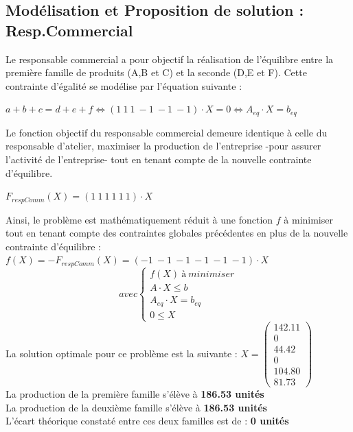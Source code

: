 \documentclass[a4paper, 11pt]{article}
\begin{document}
\subsection{Modélisation et Proposition de solution : Resp.Commercial}
Le responsable commercial a pour objectif la réalisation de l'équilibre entre la première famille de produits (A,B et C) et la seconde (D,E et F). Cette contrainte d'égalité se modélise par l'équation suivante :
\begin{center}
$ a+ b+ c = d+ e+ f\Leftrightarrow(1~1~1~-1~-1~-1)\cdot X = 0 \Leftrightarrow A_{eq}\cdot X = b_{eq} $
\end{center}
Le fonction objectif du responsable commercial demeure identique à celle du responsable d'atelier, maximiser la production de l'entreprise -pour assurer l'activité de l'entreprise- tout en tenant compte de la nouvelle contrainte d'équilibre.
\begin{center}
$F_{respComm} (X) =(1~1~1~1~1~1)\cdot X$ \\
\end{center}
Ainsi, le problème est mathématiquement réduit à une fonction $f$ à minimiser tout en tenant compte des contraintes globales précédentes en plus de la nouvelle contrainte d'équilibre :
$f(X) = -F_{respComm} (X) =(-1~-1~-1~-1~-1~-1)\cdot X$ \\
$$
avec \left\{\begin{split}
	f(X)\ à\ minimiser\\
    A\cdot X \leq b\\
    A_{eq}\cdot X = b_{eq}\\
    0 \leq X
\end{split}\right.
$$
La solution optimale pour ce problème est la suivante :
$ X =\begin{pmatrix}
142.11\\
0\\
44.42\\
0\\
104.80\\
81.73
\end{pmatrix} $\\
La production de la première famille s'élève à \textbf{186.53 unités}\\
La production de la deuxième famille s'élève à \textbf{186.53 unités}\\
L'écart théorique constaté entre ces deux familles est de : \textbf{0 unités}
\end{document}
